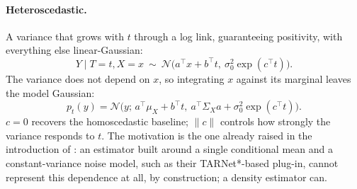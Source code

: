 \documentclass[11pt]{article}
\theoremstyle{plain}
\theoremstyle{definition}
\theoremstyle{remark}
\begin{document}
\paragraph{Heteroscedastic.} A variance that grows with $t$ through a log link, guaranteeing
positivity, with everything else linear-Gaussian:
\begin{equation}
Y \mid T=t,X=x \ \sim\ \mathcal N\big(a^\top x + b^\top t,\ \sigma_0^2\exp(c^\top t)\big).
\label{eq:app-dgp-heterosc}
\end{equation}
The variance does not depend on $x$, so integrating $x$ against its marginal leaves the model
Gaussian:
\begin{equation}
p_t(y) = \mathcal N\big(y;\, a^\top\mu_X + b^\top t,\ a^\top\Sigma_X a + \sigma_0^2\exp(c^\top t)\big).
\label{eq:app-dgp-heterosc-density}
\end{equation}
$c=0$ recovers the homoscedastic baseline; $\|c\|$ controls how strongly the variance responds to
$t$. The motivation is the one already raised in the introduction of \citet{melnychuk2023flows}:
an estimator built around a single conditional mean and a constant-variance noise model, such as
their TARNet*-based plug-in, cannot represent this dependence at all, by construction; a density
estimator can.
\end{document}
